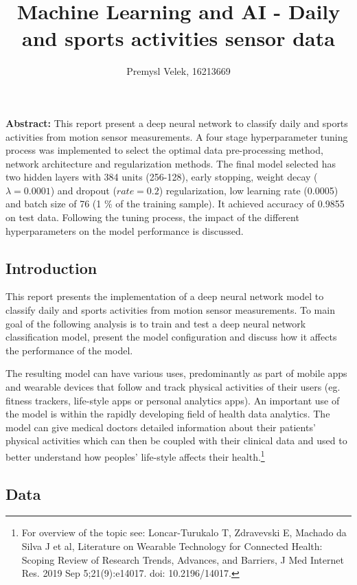 \documentclass[]{article}
\title{Machine Learning and AI - Daily and sports activities sensor data}
\author{Premysl Velek, 16213669}
\date{}
\let\rmarkdownfootnote\footnote%
\def\footnote{\protect\rmarkdownfootnote}
\begin{document}
\maketitle

\textbf{Abstract:} This report present a deep neural network to classify
daily and sports activities from motion sensor measurements. A four
stage hyperparameter tuning process was implemented to select the
optimal data pre-processing method, network architecture and
regularization methods. The final model selected has two hidden layers
with 384 units (256-128), early stopping, weight decay
(\(\lambda = 0.0001\)) and dropout (\(rate = 0.2\)) regularization, low
learning rate (0.0005) and batch size of 76 (1 \% of the training
sample). It achieved accuracy of 0.9855 on test data. Following the
tuning process, the impact of the different hyperparameters on the model
performance is discussed.

\hypertarget{introduction}{%
\subsection{Introduction}\label{introduction}}

This report presents the implementation of a deep neural network model
to classify daily and sports activities from motion sensor measurements.
To main goal of the following analysis is to train and test a deep
neural network classification model, present the model configuration and
discuss how it affects the performance of the model.

The resulting model can have various uses, predominantly as part of
mobile apps and wearable devices that follow and track physical
activities of their users (eg. fitness trackers, life-style apps or
personal analytics apps). An important use of the model is within the
rapidly developing field of health data analytics. The model can give
medical doctors detailed information about their patients' physical
activities which can then be coupled with their clinical data and used
to better understand how peoples' life-style affects their
health.\footnote{For overview of the topic see: Loncar-Turukalo T,
  Zdravevski E, Machado da Silva J et al, Literature on Wearable
  Technology for Connected Health: Scoping Review of Research Trends,
  Advances, and Barriers, J Med Internet Res. 2019 Sep 5;21(9):e14017.
  doi: 10.2196/14017.}

\hypertarget{data}{%
\subsection{Data}\label{data}}
\end{document}
